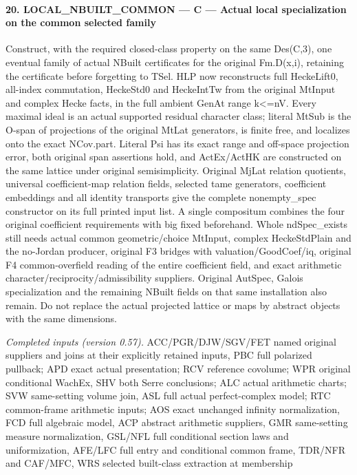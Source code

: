 \documentclass[11pt,a4paper]{article}
\numberwithin{equation}{section}
\theoremstyle{remark}\newtheorem{remark}[theorem]{Remark}
\begin{document}
\paragraph{20. LOCAL\_\allowbreak NBUILT\_\allowbreak COMMON — C — Actual local specialization on the common selected family}

Construct, with the required closed-class property on the same Des(C,3), one eventual family of actual NBuilt certificates for the original Fm.D(x,i), retaining the certificate before forgetting to TSel. HLP now reconstructs full HeckeLift0, all-index commutation, HeckeStd0 and HeckeIntTw from the original MtInput and complex Hecke facts, in the full ambient GenAt range k<=nV. Every maximal ideal is an actual supported residual character class; literal MtSub is the O-span of projections of the original MtLat generators, is finite free, and localizes onto the exact NCov.part. Literal Psi has its exact range and off-space projection error, both original span assertions hold, and ActEx/ActHK are constructed on the same lattice under original semisimplicity. Original MjLat relation quotients, universal coefficient-map relation fields, selected tame generators, coefficient embeddings and all identity transports give the complete nonempty\_\allowbreak spec constructor on its full printed input list. A single compositum combines the four original coefficient requirements with big fixed beforehand. Whole ndSpec\_\allowbreak exists still needs actual common geometric/choice MtInput, complex HeckeStdPlain and the no-Jordan producer, original F3 bridges with valuation/GoodCoef/iq, original F4 common-overfield reading of the entire coefficient field, and exact arithmetic character/reciprocity/admissibility suppliers. Original AutSpec, Galois specialization and the remaining NBuilt fields on that same installation also remain. Do not replace the actual projected lattice or maps by abstract objects with the same dimensions.

\emph{Completed inputs (version 0.57).} ACC/PGR/DJW/SGV/FET named original suppliers and joins at their explicitly retained inputs, PBC full polarized pullback; APD exact actual presentation; RCV reference covolume; WPR original conditional WachEx, SHV both Serre conclusions; ALC actual arithmetic charts; SVW same-setting volume join, ASL full actual perfect-complex model; RTC common-frame arithmetic inputs; AOS exact unchanged infinity normalization, FCD full algebraic model, ACP abstract arithmetic suppliers, GMR same-setting measure normalization, GSL/NFL full conditional section laws and uniformization, AFE/LFC full entry and conditional common frame, TDR/NFR and CAF/MFC, WRS selected built-class extraction at membership
\end{document}
